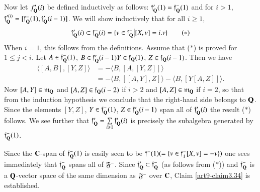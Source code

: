 \setcounter{subsection}{34}
\subsection{}\label{art9-subsec3.35}
Now let $f'_{\mathbf{Q}} (i)$ be defined inductively as follows: $\mathfrak{f}'_{\mathbf{Q}} (1) = \mathfrak{f}^-_{\mathbf{Q}} (1)$ and for $i > 1$, $\mathfrak{f}'^{(i)}_{\mathbf{Q}} = [\mathfrak{f}^-_{\mathbf{Q}} (1), \mathfrak{f}'_{\mathbf{Q}} (i-1)]$. We will show inductively that for all $i \geqslant 1$,
\begin{equation*}
\mathfrak{f}'_{\mathbf{Q}} (i) \subset \mathfrak{f}^-_{\mathbf{Q}} (i) = \{v \in \mathfrak{f}^-_{\mathbf{Q}} \big| [X, v] = i. v\} \tag*{$(\ast)$}
\end{equation*}
When $i =1$, this follows from the definitions. Assume that ($\ast$) is proved for $1 \leqslant j < i$. Let $A \in \mathfrak{f}^-_{\mathbf{Q}} (1)$, $B \in \mathfrak{f}'_{\mathbf{Q}} (i-1) Y \in \mathfrak{f}_{\mathbf{Q}} (1)$, $Z \in \mathfrak{f}_{\mathbf{Q}} (i-1)$.  Then we have 
\begin{align*}
\langle [A, B],  [Y, Z] \rangle  & = - \langle B, [A, [Y, Z]] \rangle \\
&  = - \langle B, [[A, Y], Z] \rangle  - \langle B, [Y [A, Z]] \rangle.
\end{align*}
Now $[A, Y]\in\mathfrak{m}_{\mathbf{Q}}$ and $[A, Z] \in \mathfrak{f}_{\mathbf{Q}} (i-2)$ if $i > 2$ and $[A, Z] \in\mathfrak{m}_{\mathbf{Q}}$ if $i = 2$, so that from the induction hypothesis we conclude that the right-hand side belongs to $\mathbf{Q}$. Since the elements $[Y, Z]$, $Y \in \mathfrak{f}^-_{\mathbf{Q}} (1)$, $Z \in \mathfrak{f}'_{\mathbf{Q}} (i-1)$ span all of $\mathfrak{f}'_{\mathbf{Q}} (i)$ the result ($\ast$) follows. We see further that $\mathfrak{f}'_{\mathbf{Q}} = \sum\limits_{i \geqslant 1} \mathfrak{f}'_{\mathbf{Q}} (i)$ is precisely the subalgebra generated by $\mathfrak{f}^-_{\mathbf{Q}} (1)$.

Since the $\mathbf{C}$-span of $\mathfrak{f}^-_{\mathbf{Q}}(1)$ is easily seen to be $\mathfrak{f}^-(1) (= \{v \in \mathfrak{f}_1^- [X, v] =- v\})$ one sees immediately that $\mathfrak{f}^-_{\mathbf{Q}}$ spans all of $\mathfrak{F}^-$. Since $\mathfrak{f}'_{\mathbf{Q}} \subset \mathfrak{f}^-_{\mathbf{Q}}$ (as follows from ($\ast$)) and $\mathfrak{f}^-_{\mathbf{Q}}$ is a $\mathbf{Q}$-vector space of the same dimension as $\mathfrak{F}^-$ over $\mathbf{C}$, Claim \ref{art9-claim3.34} is established.

